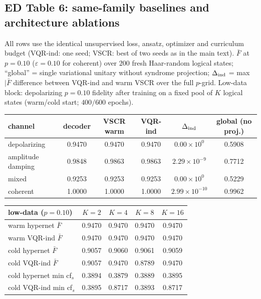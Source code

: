 \documentclass[10pt,a4paper]{article}
\begin{document}
\subsection*{ED Table 6: same-family baselines and architecture ablations}
All rows use the identical unsupervised loss, ansatz, optimizer and
curriculum budget (VQR-ind: one seed; VSCR: best of two seeds as in the main
text). $\bar F$ at $p=0.10$ ($\varepsilon=0.10$ for coherent) over $200$
fresh Haar-random logical states; ``global'' = single variational unitary
without syndrome projection; $\Delta_{\rm ind}$ = max $|\bar F$ difference
between VQR-ind and warm VSCR over the full $p$-grid. Low-data block:
depolarizing $p=0.10$ fidelity after training on a fixed pool of $K$ logical
states (warm/cold start; $400/600$ epochs).
\begin{longtable}{lccccc}
\toprule channel & decoder & VSCR warm & VQR-ind & $\Delta_{\rm ind}$ & global (no proj.) \\ \midrule
depolarizing & 0.9470 & 0.9470 & 0.9470 & $0.00\times 10^{0}$ & 0.5908 \\
amplitude damping & 0.9848 & 0.9863 & 0.9863 & $2.29\times 10^{-9}$ & 0.7712 \\
mixed & 0.9253 & 0.9253 & 0.9253 & $0.00\times 10^{0}$ & 0.5229 \\
coherent & 1.0000 & 1.0000 & 1.0000 & $2.99\times 10^{-10}$ & 0.9962 \\
\bottomrule\end{longtable}
\begin{longtable}{lcccc}
\toprule low-data ($p=0.10$) & $K=2$ & $K=4$ & $K=8$ & $K=16$ \\ \midrule
warm hypernet $\bar F$ & 0.9470 & 0.9470 & 0.9470 & 0.9470 \\
warm VQR-ind $\bar F$ & 0.9470 & 0.9470 & 0.9470 & 0.9470 \\
cold hypernet $\bar F$ & 0.9057 & 0.9060 & 0.9061 & 0.9059 \\
cold VQR-ind $\bar F$ & 0.9057 & 0.9470 & 0.8789 & 0.9470 \\
cold hypernet min cf$_s$ & 0.3894 & 0.3879 & 0.3889 & 0.3895 \\
cold VQR-ind min cf$_s$ & 0.3895 & 0.8717 & 0.3893 & 0.8717 \\
\bottomrule\end{longtable}
\end{document}
